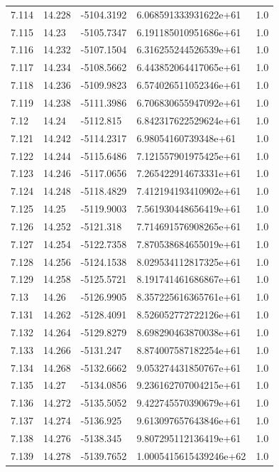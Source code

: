\begin{tabular}{lllll}
7.114 & 14.228 & -5104.3192 & 6.068591333931622e+61 & 1.0 \\
7.115 & 14.23 & -5105.7347 & 6.191185010951686e+61 & 1.0 \\
7.116 & 14.232 & -5107.1504 & 6.316255244526539e+61 & 1.0 \\
7.117 & 14.234 & -5108.5662 & 6.443852064417065e+61 & 1.0 \\
7.118 & 14.236 & -5109.9823 & 6.574026511052346e+61 & 1.0 \\
7.119 & 14.238 & -5111.3986 & 6.706830655947092e+61 & 1.0 \\
7.12 & 14.24 & -5112.815 & 6.842317622529624e+61 & 1.0 \\
7.121 & 14.242 & -5114.2317 & 6.98054160739348e+61 & 1.0 \\
7.122 & 14.244 & -5115.6486 & 7.121557901975425e+61 & 1.0 \\
7.123 & 14.246 & -5117.0656 & 7.265422914673331e+61 & 1.0 \\
7.124 & 14.248 & -5118.4829 & 7.412194193410902e+61 & 1.0 \\
7.125 & 14.25 & -5119.9003 & 7.561930448656419e+61 & 1.0 \\
7.126 & 14.252 & -5121.318 & 7.714691576908265e+61 & 1.0 \\
7.127 & 14.254 & -5122.7358 & 7.870538684655019e+61 & 1.0 \\
7.128 & 14.256 & -5124.1538 & 8.029534112817325e+61 & 1.0 \\
7.129 & 14.258 & -5125.5721 & 8.191741461686867e+61 & 1.0 \\
7.13 & 14.26 & -5126.9905 & 8.357225616365761e+61 & 1.0 \\
7.131 & 14.262 & -5128.4091 & 8.526052772722126e+61 & 1.0 \\
7.132 & 14.264 & -5129.8279 & 8.698290463870038e+61 & 1.0 \\
7.133 & 14.266 & -5131.247 & 8.874007587182254e+61 & 1.0 \\
7.134 & 14.268 & -5132.6662 & 9.053274431850767e+61 & 1.0 \\
7.135 & 14.27 & -5134.0856 & 9.236162707004215e+61 & 1.0 \\
7.136 & 14.272 & -5135.5052 & 9.422745570390679e+61 & 1.0 \\
7.137 & 14.274 & -5136.925 & 9.613097657643846e+61 & 1.0 \\
7.138 & 14.276 & -5138.345 & 9.807295112136419e+61 & 1.0 \\
7.139 & 14.278 & -5139.7652 & 1.0005415615439246e+62 & 1.0 \\

\end{tabular}
